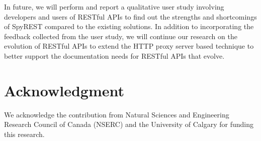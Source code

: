 \documentclass[conference]{IEEEtran}
\begin{document}
In future, we will perform and report a qualitative user study involving developers and users of RESTful APIs to find out the strengths and shortcomings of SpyREST compared to the existing solutions. In addition to incorporating the feedback collected from the user study, we will continue our research on the evolution of RESTful APIs to extend the HTTP proxy server based technique to better support the documentation needs for RESTful APIs that evolve.

\section*{Acknowledgment}
\small
We acknowledge the contribution from Natural Sciences and Engineering Research Council of Canada (NSERC) and the University of Calgary for funding this research.

\normalsize



\end{document}
